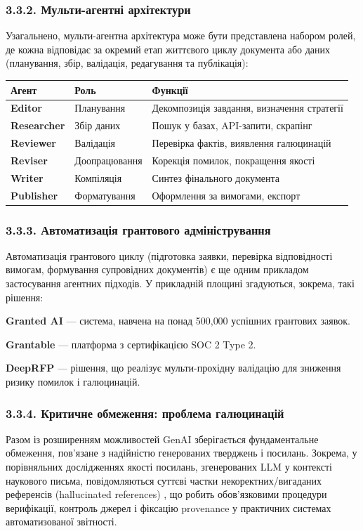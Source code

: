 \subsubsection*{3.3.2. Мульти-агентні архітектури}

Узагальнено, мульти-агентна архітектура може бути представлена набором ролей, де кожна відповідає за окремий етап життєвого циклу документа або даних (планування, збір, валідація, редагування та публікація):

\begin{longtable}{@{}p{}p{}p{}@{}}
\toprule
\textbf{Агент} & \textbf{Роль} & \textbf{Функції} \\
\midrule
\textbf{Editor} & Планування & Декомпозиція завдання, визначення стратегії \\
\textbf{Researcher} & Збір даних & Пошук у базах, API-запити, скрапінг \\
\textbf{Reviewer} & Валідація & Перевірка фактів, виявлення галюцинацій \\
\textbf{Reviser} & Доопрацювання & Корекція помилок, покращення якості \\
\textbf{Writer} & Компіляція & Синтез фінального документа \\
\textbf{Publisher} & Форматування & Оформлення за вимогами, експорт \\
\bottomrule
\end{longtable}

\subsubsection*{3.3.3. Автоматизація грантового адміністрування}

Автоматизація грантового циклу (підготовка заявки, перевірка відповідності вимогам, формування супровідних документів) є ще одним прикладом застосування агентних підходів. У прикладній площині згадуються, зокрема, такі рішення:

\textbf{Granted AI} --- система, навчена на понад 500{,}000 успішних грантових заявок.

\textbf{Grantable} --- платформа з сертифікацією SOC 2 Type 2.

\textbf{DeepRFP} --- рішення, що реалізує мульти-прохідну валідацію для зниження ризику помилок і галюцинацій.

\subsubsection*{3.3.4. Критичне обмеження: проблема галюцинацій}

Разом із розширенням можливостей GenAI зберігається фундаментальне обмеження, пов'язане з надійністю генерованих тверджень і посилань. Зокрема, у порівняльних дослідженнях якості посилань, згенерованих LLM у контексті наукового письма, повідомляються суттєві частки некоректних/вигаданих референсів (hallucinated references) \cite{Chelli2024HallucinationRates}, що робить обов'язковими процедури верифікації, контроль джерел і фіксацію provenance у практичних системах автоматизованої звітності.